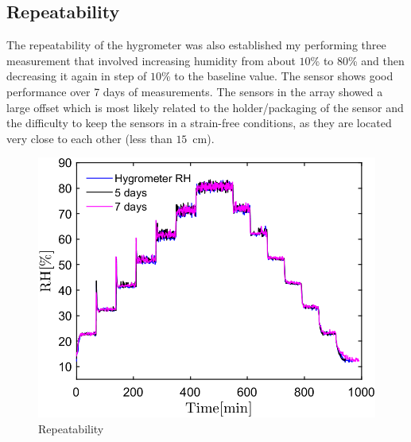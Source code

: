 \subsection{Repeatability}
The repeatability of the hygrometer was also established my performing three measurement that involved increasing humidity from about $10$\% to $80$\% and then decreasing it again in step of $10$\% to the baseline value. The sensor shows good performance over 7 days of measurements. The sensors in the array showed a large offset which is most likely related to the holder/packaging of the sensor and the difficulty to keep the sensors in a strain-free conditions, as they are located very close to each other (less than $15$~cm).
\begin{figure}[!h]
\centering
\includegraphics[width=0.6\columnwidth]{Chapter5/images/repeat.png}
\caption{Repeatability}
\label{fig_repeatability}
\end{figure}



